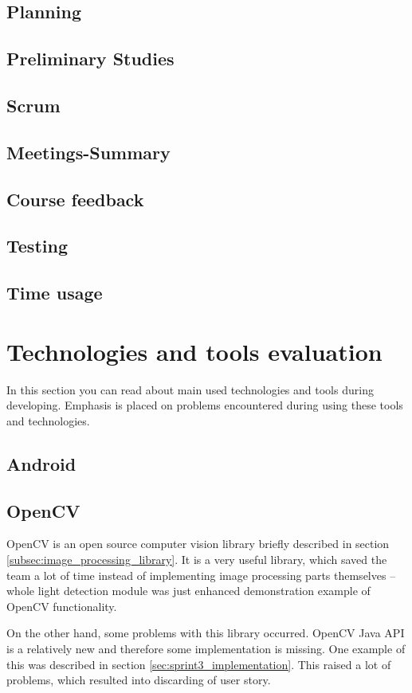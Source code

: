 \subsection{Planning}
\subsection{Preliminary Studies}
\subsection{Scrum}
\subsection{Meetings-Summary}
\subsection{Course feedback}
\subsection{Testing}
\subsection{Time usage}
\section{Technologies and tools evaluation}
In this section you can read about main used technologies and tools during developing.
Emphasis is placed on problems encountered during using these tools and technologies.

\subsection{Android}

\subsection{OpenCV}
OpenCV is an open source computer vision library briefly described in section \ref{subsec:image_processing_library}.
It is a very useful library, which saved the team a lot of time instead of implementing image processing parts themselves
 -- whole light detection module was just enhanced demonstration example of OpenCV functionality.

On the other hand, some problems with this library occurred.
OpenCV Java API is a relatively new and therefore some implementation is missing.
One example of this was described in section \ref{sec:sprint3_implementation}.
This raised a lot of problems, which resulted into discarding of user story.

